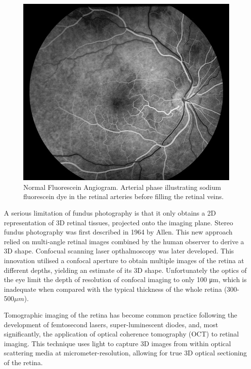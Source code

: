 \begin{figure}[htbp]
\centering
  \includegraphics{figures/fluore_angio}
\caption{Normal Fluorescein Angiogram. Arterial phase illustrating sodium fluorescein dye in the retinal arteries before filling the retinal veins.\cite{medicine_uiowa}}
\label{fig:fluore_angio_image}
\end{figure}

A serious limitation of fundus photography is that it only obtains a 2D representation of 3D retinal tissues, projected onto the imaging plane.  Stereo fundus photography was first described in 1964 by Allen.\cite{allen1964ocular}  This new approach relied on multi-angle retinal images combined by the human observer to derive a 3D shape.  Confocual scanning laser opthalmoscopy was later developed.  This innovation utilised a confocal aperture to obtain multiple images of the retina at different depths, yielding an estimate of its 3D shape.  Unfortunately the optics of the eye limit the depth of resolution of confocal imaging to only 100 μm, which is inadequate when compared with the typical thickness of the whole retina (300-500$\mu m$).\cite{webb1987confocal}

Tomographic imaging of the retina has become common practice following the development of femtosecond lasers, super-luminescent diodes, and, most significantly, the application of optical coherence tomography (OCT) to retinal imaging.\cite{huang1991optical}  This technique uses light to capture 3D images from within optical scattering media at micrometer-resolution, allowing for true 3D optical sectioning of the retina.\cite{van2007recent}



